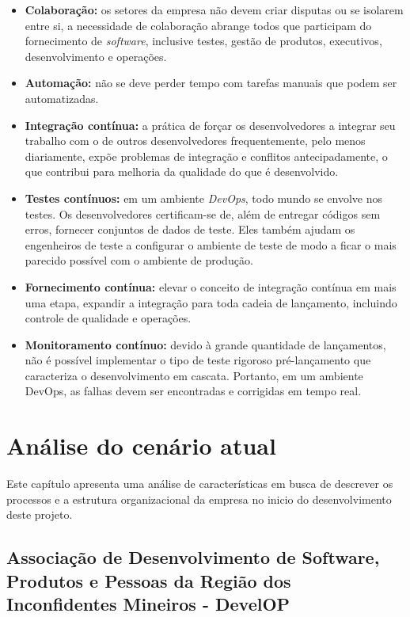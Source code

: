 \documentclass[
	12pt,				%
	openright,			%
	oneside,			%
	a4paper,			%
	english,			%
	french,				%
	spanish,			%
	brazil,				%
	]{abntex2}
\begin{document}
\begin{itemize}
	\item \textbf{Colaboração:} os setores da empresa não devem criar disputas ou se isolarem entre si, a necessidade de colaboração abrange todos que participam do fornecimento de \textit{software}, inclusive testes, gestão de produtos, executivos, desenvolvimento e operações.
	\item \textbf{Automação:} não se deve perder tempo com tarefas manuais que podem ser automatizadas.
	\item \textbf{Integração contínua:} a prática de forçar os desenvolvedores a integrar seu trabalho com o de outros desenvolvedores frequentemente, pelo menos diariamente, expõe problemas de integração e conflitos antecipadamente, o que contribui para melhoria da qualidade do que é desenvolvido.
	\item \textbf{Testes contínuos:} em um ambiente \textit{DevOps}, todo mundo se envolve nos testes. Os desenvolvedores certificam-se de, além de entregar códigos sem erros, fornecer conjuntos de dados de teste. Eles também ajudam os engenheiros de teste a configurar o ambiente de teste de modo a ficar o mais parecido possível com o ambiente de produção.
	\item \textbf{Fornecimento contínua:} elevar o conceito de integração contínua em mais uma etapa, expandir a integração para toda cadeia de lançamento, incluindo controle de qualidade e operações.
	\item \textbf{Monitoramento contínuo:} devido à grande quantidade de lançamentos, não é possível implementar o tipo de teste rigoroso pré-lançamento que caracteriza o desenvolvimento em cascata. Portanto, em um ambiente DevOps, as falhas devem ser encontradas e corrigidas em tempo real.
\end{itemize}



\chapter{Análise do cenário atual}

Este capítulo apresenta uma análise de características em busca de descrever os processos e a estrutura organizacional da empresa no inicio do desenvolvimento deste projeto.

\section{Associação de Desenvolvimento de Software, Produtos e Pessoas da Região dos Inconfidentes Mineiros - DevelOP}
\end{document}
